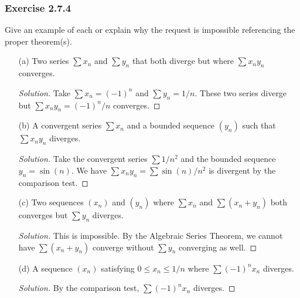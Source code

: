 \subsubsection{Exercise 2.7.4} Give an example of each or explain why the request is impossible referencing the proper theorem(s).
\begin{enumerate}
    \item[(a)] Two series \( \sum x_n \) and \( \sum y_n \) that both diverge but where \(\sum x_ny_n \) converges.
        \begin{proof}[Solution]
        Take \(\sum x_n = (-1)^n\) and \( \sum y_n = 1/n\). These two series diverge but \(\sum x_n y_n = (-1)^n / n \) converges.
        \end{proof}
    \item[(b)] A convergent series \( \sum x_n \) and a bounded sequence \( (y_n)\) such that \( \sum x_n y_n \) diverges.
        \begin{proof}[Solution]
        Take the convergent series \( \sum 1 / n^2\) and the bounded sequence \( y_n = \sin(n)\). We have \( \sum x_n y_n = \sum \sin(n)/n^2\) is divergent by the comparison test.
        \end{proof}
    \item[(c)] Two sequences \( (x_n)\) and \((y_n)\) where \(\sum x_n \) and \( \sum (x_n + y_n)\) both converges but \( \sum y_n \) diverges.
        \begin{proof}[Solution]
        This is impossible. By the Algebraic Series Theorem, we cannot have \( \sum (x_n + y_n)\) converge without \( \sum y_n \) converging as well. 
        \end{proof}
    \item[(d)] A sequence \( (x_n)\) satisfying \( 0 \leq x_n \leq 1/n\) where \( \sum (-1)^n x_n\) diverges.
        \begin{proof}[Solution]
        By the comparison test, \( \sum (-1)^n x_n \) diverges.
        \end{proof}
\end{enumerate}

